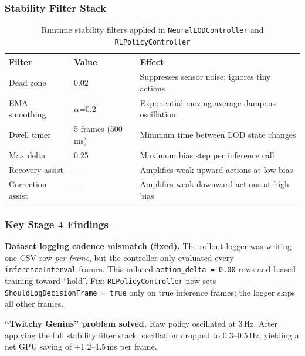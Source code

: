 \documentclass[12pt, a4paper]{article}
\begin{document}
\subsubsection{Stability Filter Stack}

\begin{table}[H]
\centering
\caption{Runtime stability filters applied in \texttt{NeuralLODController} and
  \texttt{RLPolicyController}}
\label{tab:stability}
\begin{tabular}{l l p{6.5cm}}
\toprule
Filter & Value & Effect\\
\midrule
Dead zone & 0.02 & Suppresses sensor noise; ignores tiny actions\\
EMA smoothing & $\alpha$=0.2 & Exponential moving average dampens oscillation\\
Dwell timer & 5 frames (500\,ms) & Minimum time between LOD state changes\\
Max delta & 0.25 & Maximum bias step per inference call\\
Recovery assist & — & Amplifies weak upward actions at low bias\\
Correction assist & — & Amplifies weak downward actions at high bias\\
\bottomrule
\end{tabular}
\end{table}

\subsubsection{Key Stage 4 Findings}

\begin{warningbox}
\textbf{Dataset logging cadence mismatch (fixed).}
The rollout logger was writing one CSV row \emph{per frame}, but the controller
only evaluated every \texttt{inferenceInterval} frames. This inflated
\texttt{action\_delta\,=\,0.00} rows and biased training toward ``hold''.
Fix: \texttt{RLPolicyController} now sets \texttt{ShouldLogDecisionFrame\,=\,true}
only on true inference frames; the logger skips all other frames.
\end{warningbox}

\begin{successbox}
\textbf{``Twitchy Genius'' problem solved.}
Raw policy oscillated at 3\,Hz. After applying the full stability filter stack,
oscillation dropped to 0.3–0.5\,Hz, yielding a net GPU saving of
+1.2–1.5\,ms per frame.
\end{successbox}
\end{document}
